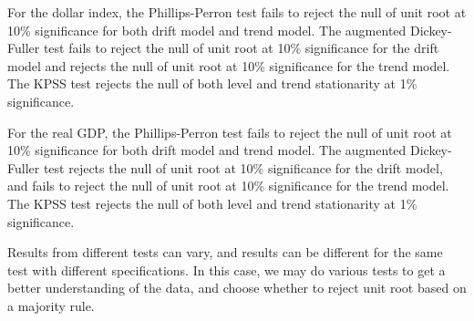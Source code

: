 \documentclass[12pt]{article}
\begin{document}
    For the dollar index, the Phillips-Perron test fails to reject the null of unit root at 10\% significance for both drift model and trend model. The augmented Dickey-Fuller test fails to reject the null of unit root at 10\% significance for the drift model and rejects the null of unit root at 10\% significance for the trend model. The KPSS test rejects the null of both level and trend stationarity at 1\% significance.

    For the real GDP, the Phillips-Perron test fails to reject the null of unit root at 10\% significance for both drift model and trend model. The augmented Dickey-Fuller test rejects the null of unit root at 10\% significance for the drift model, and fails to reject the null of unit root at 10\% significance for the trend model. The KPSS test rejects the null of both level and trend stationarity at 1\% significance.

    Results from different tests can vary, and results can be different for the same test with different specifications. In this case, we may do various tests to get a better understanding of the data, and choose whether to reject unit root based on a majority rule.

\newpage
\end{document}
